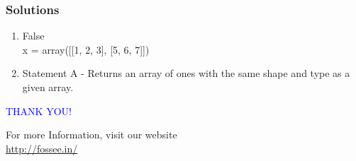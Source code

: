 \documentclass[presentation]{beamer}
\begin{document}
\begin{frame}
\frametitle{Solutions}
\label{sec-11}


\begin{enumerate}
\item False\\
     x = array([[1, 2, 3], [5, 6, 7]])
\vspace{12pt}
\item Statement A - Returns an array of ones with the same shape and type as a
                  given array.
\end{enumerate}
\end{frame}
\begin{frame}

  \begin{block}{}
  \begin{center}
  \textcolor{blue}{\Large THANK YOU!} 
  \end{center}
  \end{block}
\begin{block}{}
  \begin{center}
    For more Information, visit our website\\
    \url{http://fossee.in/}
  \end{center}  
  \end{block}
\end{frame}
\end{document}
